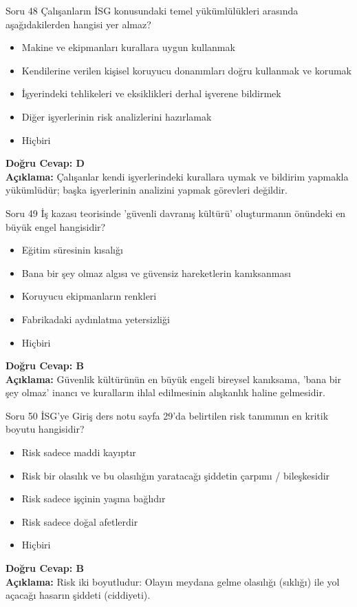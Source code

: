 \documentclass[12pt,a4paper]{article}
\begin{document}
\begin{testcard}{Soru 48}
    Çalışanların İSG konusundaki temel yükümlülükleri arasında aşağıdakilerden hangisi yer almaz?
    \begin{itemize}
        \item[A)] Makine ve ekipmanları kurallara uygun kullanmak
        \item[B)] Kendilerine verilen kişisel koruyucu donanımları doğru kullanmak ve korumak
        \item[C)] İşyerindeki tehlikeleri ve eksiklikleri derhal işverene bildirmek
        \item[D)] Diğer işyerlerinin risk analizlerini hazırlamak
        \item[E)] Hiçbiri
    \end{itemize}
    \tcblower
    \textbf{Doğru Cevap: D} \\
    \textbf{Açıklama:} Çalışanlar kendi işyerlerindeki kurallara uymak ve bildirim yapmakla yükümlüdür; başka işyerlerinin analizini yapmak görevleri değildir.
\end{testcard}

\begin{testcard}{Soru 49}
    İş kazası teorisinde 'güvenli davranış kültürü' oluşturmanın önündeki en büyük engel hangisidir?
    \begin{itemize}
        \item[A)] Eğitim süresinin kısalığı
        \item[B)] Bana bir şey olmaz algısı ve güvensiz hareketlerin kanıksanması
        \item[C)] Koruyucu ekipmanların renkleri
        \item[D)] Fabrikadaki aydınlatma yetersizliği
        \item[E)] Hiçbiri
    \end{itemize}
    \tcblower
    \textbf{Doğru Cevap: B} \\
    \textbf{Açıklama:} Güvenlik kültürünün en büyük engeli bireysel kanıksama, 'bana bir şey olmaz' inancı ve kuralların ihlal edilmesinin alışkanlık haline gelmesidir.
\end{testcard}

\begin{testcard}{Soru 50}
    İSG'ye Giriş ders notu sayfa 29'da belirtilen risk tanımının en kritik boyutu hangisidir?
    \begin{itemize}
        \item[A)] Risk sadece maddi kayıptır
        \item[B)] Risk bir olasılık ve bu olasılığın yaratacağı şiddetin çarpımı / bileşkesidir
        \item[C)] Risk sadece işçinin yaşına bağlıdır
        \item[D)] Risk sadece doğal afetlerdir
        \item[E)] Hiçbiri
    \end{itemize}
    \tcblower
    \textbf{Doğru Cevap: B} \\
    \textbf{Açıklama:} Risk iki boyutludur: Olayın meydana gelme olasılığı (sıklığı) ile yol açacağı hasarın şiddeti (ciddiyeti).
\end{testcard}
\end{document}
